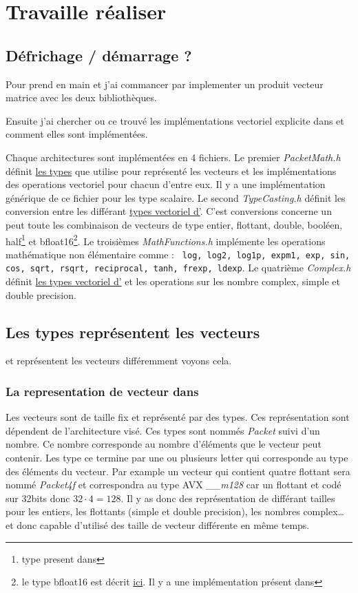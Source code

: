 \section{Travaille réaliser}

\subsection{Défrichage / démarrage ?}

Pour prend en main \Eigen et \MIPP j'ai commancer par implementer un produit
vecteur matrice avec les deux bibliothèques.

Ensuite j'ai chercher ou ce trouvé les implémentations vectoriel explicite dans \Eigen
et comment elles sont implémentées.

Chaque architectures sont implémentées en 4 fichiers. Le premier \emph{PacketMath.h}
définit \hyperref[typeEigen]{les types} que \Eigen utilise pour représenté les
vecteurs et les implémentations des operations vectoriel pour chacun d'entre eux.
Il y a une implémentation générique de ce fichier pour les type scalaire. Le second
\emph{TypeCasting.h} définit les conversion entre les différant \hyperref[typeEigen]{types
vectoriel d'\Eigen}. C'est conversions concerne un peut toute les combinaison
de vecteurs de type entier, flottant, double, booléen, half\footnote{type present dans
\Eigen} et bfloat16\footnote{le type bfloat16 est décrit
\href{https://en.wikipedia.org/wiki/Bfloat16_floating-point_format}{ici}. Il y a une
implémentation présent dans \Eigen}. Le troisièmes \emph{MathFunctions.h}
implémente les operations mathématique non élémentaire comme : \texttt{ log, log2, log1p,
expm1, exp, sin, cos, sqrt, rsqrt, reciprocal, tanh, frexp, ldexp}. Le quatrième
\emph{Complex.h} définit \hyperref[typeEigen]{les types vectoriel d'\Eigen} et
les operations sur les nombre complex, simple et double precision.

\subsection{Les types représentent les vecteurs}
\Eigen et \MIPP représentent les vecteurs différemment voyons cela.

\label{typeEigen}
\subsubsection{La representation de vecteur dans \Eigen}
{
  Les vecteurs sont de taille fix et représenté par des types. Ces représentation sont
  dépendent de l'architecture visé. Ces types sont nommés \emph{Packet} suivi d'un nombre.
  Ce nombre corresponde au nombre d'éléments que le vecteur peut contenir. Les type ce
  termine par une ou plusieurs letter qui corresponde au type des éléments du vecteur.
  Par example un vecteur qui contient quatre flottant sera nommé \emph{Packet4f} et
  correspondra au type AVX \emph{__m128} car un flottant et codé sur 32bits donc
  $32\cdot 4=128$. Il y as donc des représentation de différant tailles pour les entiers,
  les flottants (simple et double precision), les nombres complex\dots
  \Eigen et donc capable d'utilisé des taille de vecteur différente en même temps.
}

